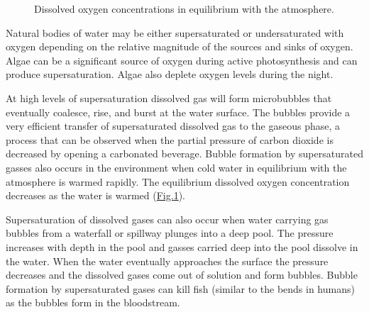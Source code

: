 \documentclass[letterpaper,10pt,english]{sphinxmanual}
\let\sphinxpxdimen\pdfpxdimen\else\newdimen\sphinxpxdimen
\begin{document}
\begin{sphinxVerbatim}[commandchars=\\\{\}]
   
 
\end{sphinxVerbatim}

\begin{figure}[htbp]
\centering
\capstart

\noindent\sphinxincludegraphics[width=300\sphinxpxdimen]{{Oxygen_vs_T}.png}
\caption{Dissolved oxygen concentrations in equilibrium with the atmosphere.}\label{\detokenize{Gas_Transfer/Gas_Transfer:id2}}\label{\detokenize{Gas_Transfer/Gas_Transfer:figure-oxygen-vs-t}}\end{figure}

Natural bodies of water may be either supersaturated or undersaturated with oxygen depending on the relative magnitude of the sources and sinks of oxygen. Algae can be a significant source of oxygen during active photosynthesis and can produce supersaturation. Algae also deplete oxygen levels during the night.

At high levels of supersaturation dissolved gas will form microbubbles that eventually coalesce, rise, and burst at the water surface. The bubbles provide a very efficient transfer of supersaturated dissolved gas to the gaseous phase, a process that can be observed when the partial pressure of carbon dioxide is decreased by opening a carbonated beverage. Bubble formation by supersaturated gasses also occurs in the environment when cold water in equilibrium with the atmosphere is warmed rapidly. The equilibrium dissolved oxygen concentration decreases as the water is warmed (\hyperref[\detokenize{Gas_Transfer/Gas_Transfer:figure-oxygen-vs-t}]{Fig.\@ \ref{\detokenize{Gas_Transfer/Gas_Transfer:figure-oxygen-vs-t}}}).

Supersaturation of dissolved gases can also occur when water carrying gas bubbles from a waterfall or spillway plunges into a deep pool. The pressure increases with depth in the pool and gasses carried deep into the pool dissolve in the water. When the water eventually approaches the surface the pressure decreases and the dissolved gases come out of solution and form bubbles. Bubble formation by supersaturated gases can kill fish (similar to the bends in humans) as the bubbles form in the bloodstream.
\end{document}

